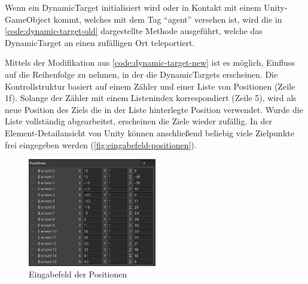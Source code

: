 Wenn ein DynamicTarget initialisiert wird oder in Kontakt mit einem Unity-GameObject kommt, welches mit dem Tag \enquote{agent} versehen ist, wird die in \autoref{code:dynamic-target-old} dargestellte Methode ausgeführt, welche das DynamicTarget an einen zufälligen Ort teleportiert.

\begin{figure}
    
\end{figure}

Mittels der Modifikation aus \autoref{code:dynamic-target-new} ist es möglich, Einfluss auf die Reihenfolge zu nehmen, in der die DynamicTargets erscheinen.
Die Kontrollstruktur basiert auf einem Zähler und einer Liste von Positionen (Zeile 1f).
Solange der Zähler mit einem Listenindex korrespondiert (Zeile 5), wird als neue Position des Ziels die in der Liste hinterlegte Position verwendet.
Wurde die Liste vollständig abgearbeitet, erscheinen die Ziele wieder zufällig.
In der Element-Detailansicht von Unity können anschließend beliebig viele Zielpunkte frei eingegeben werden (\autoref{fig:eingabefeld-positionen}).

\begin{figure}
    
\end{figure}

\begin{figure}
    \centering
    \includegraphics[width = 0.5\textwidth]{Bilder/crawler/position-list.png}
    \caption{Eingabefeld der Positionen}
    \label{fig:eingabefeld-positionen}
\end{figure}

